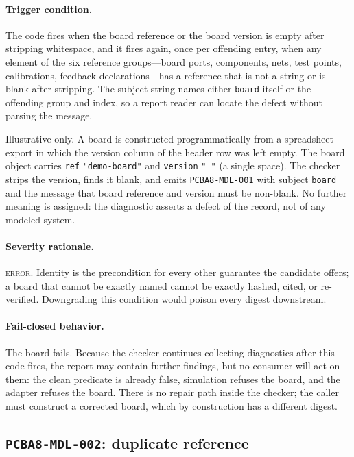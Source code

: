 \paragraph{Trigger condition.} The code fires when the board reference or the board version is empty after stripping whitespace, and it fires again, once per offending entry, when any element of the six reference groups---board ports, components, nets, test points, calibrations, feedback declarations---has a reference that is not a string or is blank after stripping. The subject string names either \texttt{board} itself or the offending group and index, so a report reader can locate the defect without parsing the message.

\begin{example}\label{ch07:ex:mdl001}
Illustrative only. A board is constructed programmatically from a spreadsheet export in which the version column of the header row was left empty. The board object carries \texttt{ref} \texttt{"demo-board"} and \texttt{version} \texttt{"~"} (a single space). The checker strips the version, finds it blank, and emits \texttt{PCBA8-MDL-001} with subject \texttt{board} and the message that board reference and version must be non-blank. No further meaning is assigned: the diagnostic asserts a defect of the record, not of any modeled system.
\end{example}

\paragraph{Severity rationale.} \textsc{error}. Identity is the precondition for every other guarantee the candidate offers; a board that cannot be exactly named cannot be exactly hashed, cited, or re-verified. Downgrading this condition would poison every digest downstream.

\paragraph{Fail-closed behavior.} The board fails. Because the checker continues collecting diagnostics after this code fires, the report may contain further findings, but no consumer will act on them: the clean predicate is already false, simulation refuses the board, and the adapter refuses the board. There is no repair path inside the checker; the caller must construct a corrected board, which by construction has a different digest.

\subsection{\texttt{PCBA8-MDL-002}: duplicate reference}\label{ch07:sub:mdl002}

